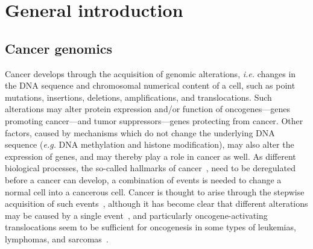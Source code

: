 


%


\chapter{General introduction}\label{ch1}
\thispagestyle{empty}				%

\newpage


%
\section{Cancer genomics}\label{cancer1}
Cancer develops through the acquisition of genomic alterations, {\it i.e.} changes in the DNA sequence and chromosomal numerical content of a cell, such as point mutations, insertions, deletions, amplifications, and translocations. Such alterations may alter protein expression and/or function of oncogenes---genes promoting cancer---and tumor suppressors---genes protecting from cancer. Other factors, caused by mechanisms which do not change the underlying DNA sequence ({\it e.g.} DNA methylation and histone modification), may also alter the expression of genes, and may thereby play a role in cancer as well. As different biological processes, the so-called hallmarks of cancer~\cite{hanahan2000hallmarks,hanahan2011hallmarks}, need to be deregulated before a cancer can develop, a combination of events is needed to change a normal cell into a cancerous cell. Cancer is thought to arise through the stepwise acquisition of such events~\cite{fearon1990genetic}, although it has become clear that different alterations may be caused by a single event~\cite{stephens2011massive,yates2012evolution}, and particularly oncogene\hyp{}activating translocations seem to be sufficient for oncogenesis in some types of leukemias, lymphomas, and sarcomas~\cite{knudson2004human}.

